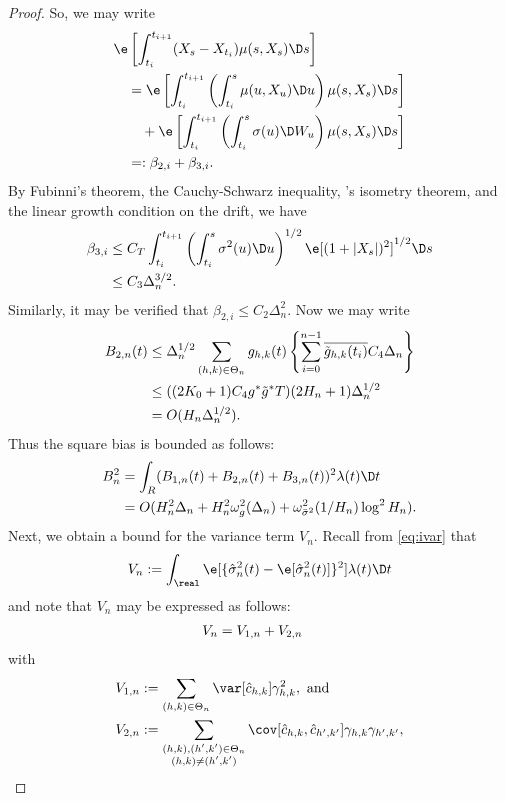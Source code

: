 \begin{proof}
So, we may write
\begin{align}
  &\e\left[\int_{t_i}^{t_{i+1}}(X_s - X_{t_i}) \mu(s,X_s) \D s\right]\notag\\
  &\quad = \e\left[\int_{t_i}^{t_{i+1}}\left( \int_{t_i}^s \mu(u,X_u) \D u\right)\mu(s,X_s) \D s\right] \notag \\
  &\qquad + \e\left[\int_{t_i}^{t_{i+1}}\left( \int_{t_i}^s \sigma(u) \D W_u\right)\mu(s,X_s) \D s\right]\notag \\
  &\quad =: \beta_{2,i} + \beta_{3,i}. \notag
\end{align}
By Fubinni's theorem,  the Cauchy-Schwarz inequality,  \ito's isometry theorem, and the linear growth condition on the drift, we have
\begin{align}
  \beta_{3,i} &\le C_T\int_{t_i}^{t_{i+1}}\left( \int_{t_i}^s \sigma^2(u) \D u\right)^{1/2}\e[(1+\vert X_s\vert)^2]^{1/2} \D s\notag\\
& \le C_3 \Delta_n^{3/2}.
  \label{}
\end{align}
Similarly, it may be verified that $\beta_{2,i} \le C_2 \Delta_n^2$. Now we may write
\begin{align}
  B_{2,n}(t) &\le \Delta_n^{1/2}\sum_{(h,k) \in \Theta_n} g_{h,k}(t)\left\{ \sum_{i=0}^{n-1} \overline{\tilde{g}_{h,k}(t_i)} C_4 \Delta_n \right\} \notag \\
  & \le ( (2K_0+1)C_4 g^*\tilde{g}^* T) (2H_n + 1)\Delta^{1/2}_n\notag\\
  & = O(H_n \Delta^{1/2}_n).
  \label{}
\end{align}
Thus the square bias is bounded as follows:
\begin{align}
  B^2_n &= \int_R (B_{1,n}(t) + B_{2,n}(t)+  B_{3,n}(t))^2 \lambda(t) \D t \notag\\
  &= O(H_n^2 \Delta_n + H^2_n\omega^2_g(\Delta_n)  + \omega^2_{\bsv}(1/H_n)\log^2H_n).
  \label{}
\end{align}
Next, we obtain a  bound for the variance term $V_n$. Recall from \eqref{eq:ivar} that
\begin{align}
V_n :=  \int_\real \e[\{\svn(t) - \e[\svn(t)]\}^2] \lambda(t) \D t \notag
\end{align}
and note that $V_n$ may be expressed as follows:
\begin{align}
  V_n & = V_{1,n} + V_{2,n} \notag
\end{align}
with
\begin{align}
  & V_{1,n} := \sum_{(h,k) \in \Theta_n}\var[\cnhk]\gamma_{h,k}^2,\text{ and} \notag\\ 
& V_{2,n} := \mathop{\sum}_{\substack{(h,k),(h',k') \in \Theta_n\\(h,k) \ne (h',k')}} \cov[\cnhk, \hat{c}_{h',k'}] \gamma_{h,k} \gamma_{h',k'},\notag

\end{align}
\end{proof}
